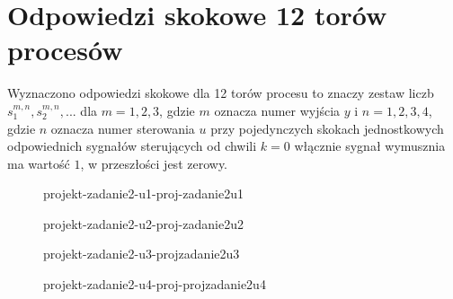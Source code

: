 \section{Odpowiedzi skokowe 12 torów procesów}
\label{projekt:zad2}


Wyznaczono odpowiedzi skokowe dla 12 torów procesu 
to znaczy zestaw liczb $s_{1}^{m,n}, s_{2}^{m,n}, ...$ dla $m = 1, 2, 3$, 
gdzie $m$ oznacza numer wyjścia $y$ i $n = 1, 2, 3, 4$, 
gdzie $n$ oznacza numer sterowania $u$ przy pojedynczych skokach jednostkowych odpowiednich sygnałów  sterujących
od chwili $k = 0$ włącznie sygnał wymusznia ma wartość $1$, 
w przeszłości jest zerowy.


\ifdefined\CompileFigures
\begin{figure}[H] 
    \centering
    
    \caption{projekt-zadanie2-u1-proj-zadanie2u1}
    \label{projekt:zad2:figure:projzadanie2u1}
\end{figure}
\fi

\ifdefined\CompileFigures
\begin{figure}[H] 
    \centering
    
    \caption{projekt-zadanie2-u2-proj-zadanie2u2}
    \label{projekt:zad2:figure:projzadanie2u2}
\end{figure}
\fi

\ifdefined\CompileFigures
\begin{figure}[H] 
    \centering
    
    \caption{projekt-zadanie2-u3-projzadanie2u3}
    \label{projekt:zad2:figure:projzadanie2u3}
\end{figure}
\fi

\ifdefined\CompileFigures
\begin{figure}[H] 
    \centering
    
    \caption{projekt-zadanie2-u4-proj-projzadanie2u4}
    \label{projekt:zad2:figure:projzadanie2u4}
\end{figure}
\fi

\newpage
